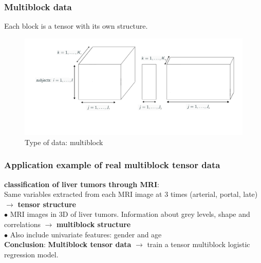 \documentclass{beamer}
\begin{document}
\begin{frame}
    \frametitle{Multiblock data}
Each block is a tensor with its own structure.
    \begin{figure}
        \centering
        \includegraphics[scale = 0.25]{images/blocks.png}
        \caption{Type of data: multiblock}
    \end{figure}


\end{frame}

\begin{frame}
    \frametitle{Application example of real multiblock tensor data}
    \textbf{classification of liver tumors through MRI}:\\[15 pt]
    Same variables extracted from each MRI image at 3 times  (arterial, portal, late) $\rightarrow$ \textbf{tensor structure}\\[10 pt]

    $\bullet$ MRI images in 3D of liver tumors. Information about grey levels, shape and correlations  $\rightarrow$ \textbf{multiblock structure}\\[5 pt]
    $\bullet$ Also include univariate features: gender and age\\[10 pt]

    \textbf{Conclusion}: \textbf{Multiblock tensor data} $\rightarrow$ train a tensor multiblock logistic regression model.
    
\end{frame}
\end{document}
